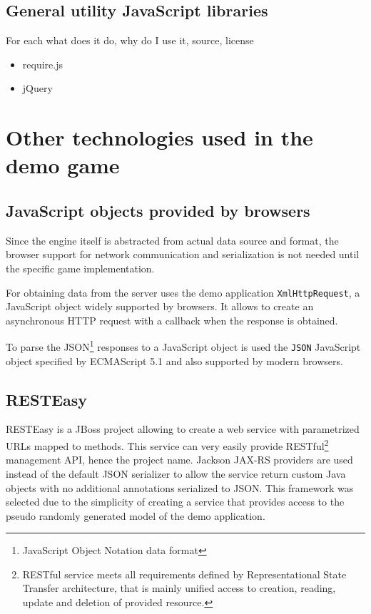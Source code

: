 \documentclass[11pt,oneside, final]{fithesis2}
\begin{document}
\subsection{General utility JavaScript libraries}
For each what does it do, why do I use it, source, license
\begin{itemize}
	\item require.js
	\item jQuery
\end{itemize}

\section{Other technologies used in the demo game}

\subsection{JavaScript objects provided by browsers}
Since the engine itself is abstracted from actual data source and format, the browser support for network communication and serialization is not needed until the specific game implementation.

For obtaining data from the server uses the demo application \texttt{XmlHttpRequest}, a JavaScript object widely supported by browsers\cite{xhr}. It allows to create an asynchronous HTTP request with a callback when the response is obtained.

To parse the JSON\footnote{JavaScript Object Notation data format} responses to a JavaScript object is used the \texttt{JSON} JavaScript object specified by ECMAScript 5.1 and also supported by modern browsers\cite{json}.

\subsection{RESTEasy}
RESTEasy is a JBoss project allowing to create a web service with parametrized URLs mapped to methods\cite{resteasy}. This service can very easily  provide RESTful\footnote{RESTful service meets all requirements defined by Representational State Transfer architecture, that is mainly unified access to creation, reading, update and deletion of provided resource\cite{fielding}.} management API, hence the project name. Jackson JAX-RS providers\cite{jackson} are used instead of the default JSON serializer to allow the service return custom Java objects with no additional annotations serialized to JSON. This framework was selected due to the simplicity of creating a service that provides access to the pseudo randomly generated model of the demo application.
\end{document}
